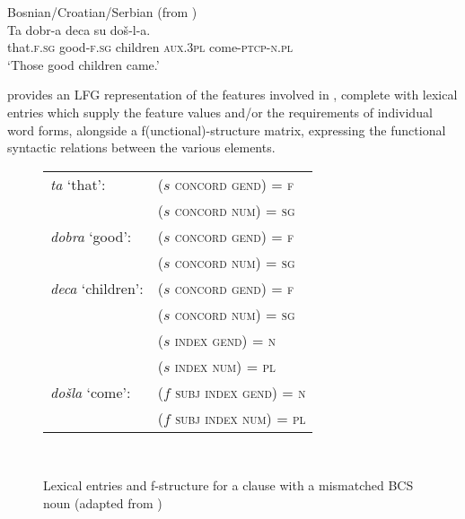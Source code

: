 \documentclass[output=paper,hidelinks]{langscibook}
\begin{document}
\ea Bosnian/Croatian/Serbian (from \citet[51]{WechslerZlatic:Agreement2003})%
    \label{ex:Slavic:6}\\
    \gll Ta             dobr-a        deca       su             doš-l-a.\\
        that.\textsc{f.sg}  good-\textsc{f.sg}  children  \textsc{aux.3pl}    come-\textsc{ptcp-n.pl}\\
    \glt `Those good children came.'    
    \z

          

 provides an LFG representation of the features involved in , complete with lexical entries which supply the feature values and/or the requirements of individual word forms, alongside a f(unctional)-structure matrix, expressing the functional syntactic relations between the various elements.

\begin{figure}\begin{tabular}{ll}
  \textit{ta} `that':     & ($s$ \textsc{concord} \textsc{gend)} \textsc{=} \textsc{f}\\
      & ($s$ \textsc{concord} \textsc{num)} \textsc{=} \textsc{sg}\\
\textit{dobra} `good':    & ($s$ \textsc{concord} \textsc{gend)} \textsc{=} \textsc{f}\\
      & ($s$ \textsc{concord} \textsc{num)} \textsc{=} \textsc{sg}\\
\textit{deca} `children':  & ($s$ \textsc{concord} \textsc{gend)} \textsc{=} \textsc{f}\\
& ($s$ \textsc{concord} \textsc{num)} \textsc{=} \textsc{sg}\\
      & ($s$ \textsc{index} \textsc{gend)} \textsc{=} \textsc{n}\\
      & ($s$ \textsc{index} \textsc{num)} \textsc{=} \textsc{pl}\\
\textit{došla} `come':    & ($f$ \textsc{subj} \textsc{index} \textsc{gend)} \textsc{=} \textsc{n}\\
      & ($f$ \textsc{subj} \textsc{index} \textsc{num)} \textsc{=} \textsc{pl}\\
  \end{tabular}\\[1ex]
  {}
\caption{Lexical entries and f-structure for a clause with a
  mismatched BCS noun (adapted from \citealt[189]{DH:Agr})}
\label{fig:Slavic:1}
\end{figure}
\end{document}
